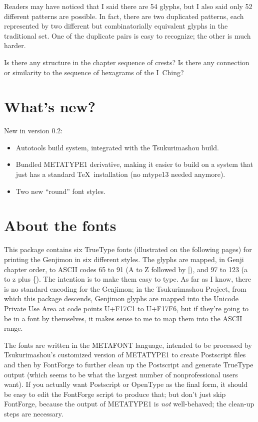 \documentclass[12pt]{article}
\begin{document}
Readers may have noticed that I said there are 54 glyphs, but I also said
only 52 different patterns are possible.  In fact, there are two duplicated
patterns, each represented by two different but combinatorially equivalent
glyphs in the traditional set.  One of the duplicate pairs is easy to
recognize; the other is much harder.

Is there any structure in the chapter sequence of crests?  Is there any
connection or similarity to the sequence of hexagrams of the I~Ching?

\section{What's new?}

New in version 0.2:
\begin{itemize}
\item Autotools build system, integrated with the Tsukurimashou build.
\item Bundled METATYPE1 derivative, making it easier to build on a system
that just has a standard \TeX\ installation (no mtype13 needed anymore).
\item Two new ``round'' font styles.
\end{itemize}

\section{About the fonts}

This package contains six TrueType fonts (illustrated on the following
pages) for printing the Genjimon in six different styles.  The glyphs are
mapped, in Genji chapter order, to ASCII codes 65 to 91 (A to Z followed by
[), and 97 to 123 (a to z plus \{).  The intention is to make them easy to
type.  As far as I know, there is no standard encoding for the Genjimon; in
the Tsukurimashou Project, from which this package descends, Genjimon glyphs
are mapped into the Unicode Private Use Area at code points U+F17C1 to
U+F17F6, but if they're going to be in a font by themselves, it makes sense
to me to map them into the ASCII range.

The fonts are written in the METAFONT language, intended to be processed by
Tsukurimashou's customized version of METATYPE1 to create Postscript files
and then by FontForge to further clean up the Postscript and generate
TrueType output (which seems to be what the largest number of
nonprofessional users want).  If you actually want Postscript or OpenType as
the final form, it should be easy to edit the FontForge script to produce
that; but don't just skip FontForge, because the output of METATYPE1 is
\emph{not} well-behaved; the clean-up steps are necessary.
\end{document}
